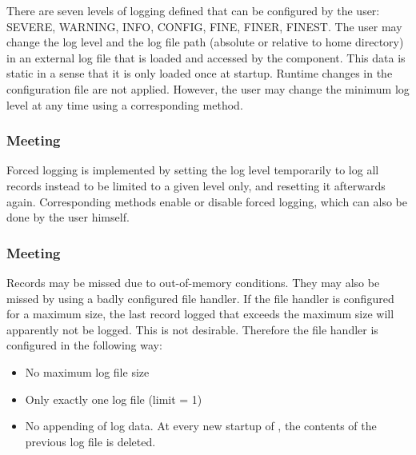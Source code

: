 There are seven levels of logging defined that can be configured by the user: SEVERE, WARNING, INFO, CONFIG, FINE, FINER, FINEST. The user may change the log level and the log file path (absolute or relative to \LibName{} home directory) in an external log file that is loaded and accessed by the \COMPconfiguration{} component. This data is static in a sense that it is only loaded once at startup. Runtime changes in the configuration file are not applied. However, the user may change the minimum log level at any time using a corresponding method.


\subsubsection{Meeting \REQUlogForcedLogging{}}
\label{sec:MeetingREQUREQUlogForcedLogging}

Forced logging is implemented by setting the log level temporarily to log all records instead to be limited to a given level only, and resetting it afterwards again. Corresponding methods enable or disable forced logging, which can also be done by the user himself.


\subsubsection{Meeting \REQUlogNoMissedRecords{}}
\label{sec:MeetingREQUlogNoMissedRecords}

Records may be missed due to out-of-memory conditions. They may also be missed by using a badly configured file handler. If the file handler is configured for a maximum size, the last record logged that exceeds the maximum size will apparently not be logged. This is not desirable. Therefore the file handler is configured in the following way:
\begin{itemize}
	\item No maximum log file size
	\item Only exactly one log file (limit = 1)
	\item No appending of log data. At every new startup of \LibName{}, the contents of the previous log file is deleted.
\end{itemize}


